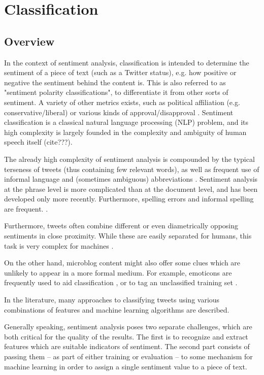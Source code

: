 \documentclass{sig-alternate}
\begin{document}
\section{Classification}

\subsection{Overview}

In the context of sentiment analysis, classification is intended to determine the sentiment of a piece of text (such as a Twitter status), e.g. how positive or negative the sentiment behind the content is. This is also referred to as "sentiment polarity classifications", to differentiate it from other sorts of sentiment. A variety of other metrics exists, such as political affiliation (e.g. conservative/liberal) or various kinds of approval/disapproval \cite{pang2008opinion}. Sentiment classification is a classical natural language processing (NLP) problem, and its high complexity is largely founded in the complexity and ambiguity of human speech itself (cite???).



The already high complexity of sentiment analysis is compounded by the typical terseness of tweets (thus containing few relevant words), as well as frequent use of informal language and (sometimes ambiguous) abbreviations \cite{kouloumpis2011twitter}. Sentiment analysis at the phrase level is more complicated than at the document level, and has been developed only more recently. Furthermore, spelling errors and informal spelling are frequent. \cite{agarwal2011sentiment}.

Furthermore, tweets often combine different or even diametrically opposing sentiments in close proximity. While these are easily separated for humans, this task is very complex for machines \cite{vinodhini2012sentiment}.

On the other hand, microblog content might also offer some clues which are unlikely to appear in a more formal medium. For example, emoticons are frequently used to aid classification \cite{agarwal2011sentiment, kouloumpis2011twitter}, or to tag an unclassified training set \cite{go2009twitter}.




In the literature, many approaches to classifying tweets using various combinations of features and machine learning algorithms are described.

Generally speaking, sentiment analysis poses two separate challenges, which are both critical for the quality of the results. The first is to recognize and extract features which are suitable indicators of sentiment. The second part consists of passing them -- as part of either training or evaluation -- to some mechanism for machine learning in order to assign a single sentiment value to a piece of text.
\end{document}
